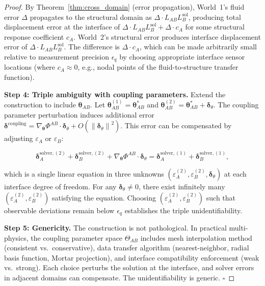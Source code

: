 \documentclass[11pt,a4paper]{article}
\theoremstyle{definition}
\newcommand{\norm}[1]{\left\lVert#1\right\rVert}
\begin{document}
\begin{proof}
By Theorem~\ref{thm:cross_domain} (error propagation), World~1's fluid error $\Delta$ propagates to the structural domain as $\Delta \cdot L_{AB} L_B^{\mathrm{sol}}$, producing total displacement error at the interface of $\Delta \cdot L_{AB} L_B^{\mathrm{sol}} + \Delta \cdot c_A$ for some structural response coefficient $c_A$. World~2's structural error produces interface displacement error of $\Delta \cdot L_{AB} L_B^{\mathrm{sol}}$. The difference is $\Delta \cdot c_A$, which can be made arbitrarily small relative to measurement precision $\epsilon_q$ by choosing appropriate interface sensor locations (where $c_A \approx 0$, e.g., nodal points of the fluid-to-structure transfer function).

\textbf{Step 4: Triple ambiguity with coupling parameters.} Extend the construction to include $\boldsymbol{\theta}_{AB}$. Let $\boldsymbol{\theta}_{AB}^{(1)} = \boldsymbol{\theta}_{AB}^*$ and $\boldsymbol{\theta}_{AB}^{(2)} = \boldsymbol{\theta}_{AB}^* + \boldsymbol{\delta}_\theta$. The coupling parameter perturbation induces additional error $\boldsymbol{\delta}^{\mathrm{coupling}} = \nabla_{\boldsymbol{\theta}} \Phi^{AB} \cdot \boldsymbol{\delta}_\theta + O(\norm{\boldsymbol{\delta}_\theta}^2)$. This error can be compensated by adjusting $\varepsilon_A$ or $\varepsilon_B$:

\begin{equation}
\boldsymbol{\delta}_A^{\mathrm{solver}, (2)} + \boldsymbol{\delta}_B^{\mathrm{solver}, (2)} + \nabla_{\boldsymbol{\theta}} \Phi^{AB} \cdot \boldsymbol{\delta}_\theta = \boldsymbol{\delta}_A^{\mathrm{solver}, (1)} + \boldsymbol{\delta}_B^{\mathrm{solver}, (1)},
\end{equation}

which is a single linear equation in three unknowns $(\varepsilon_A^{(2)}, \varepsilon_B^{(2)}, \boldsymbol{\delta}_\theta)$ at each interface degree of freedom. For any $\boldsymbol{\delta}_\theta \neq 0$, there exist infinitely many $(\varepsilon_A^{(2)}, \varepsilon_B^{(2)})$ satisfying the equation. Choosing $(\varepsilon_A^{(2)}, \varepsilon_B^{(2)})$ such that observable deviations remain below $\epsilon_q$ establishes the triple unidentifiability.

\textbf{Step 5: Genericity.} The construction is not pathological. In practical multi-physics, the coupling parameter space $\Theta_{AB}$ includes mesh interpolation method (consistent vs.\ conservative), data transfer algorithm (nearest-neighbor, radial basis function, Mortar projection), and interface compatibility enforcement (weak vs.\ strong). Each choice perturbs the solution at the interface, and solver errors in adjacent domains can compensate. The unidentifiability is generic. $\square$
\end{proof}
\end{document}
